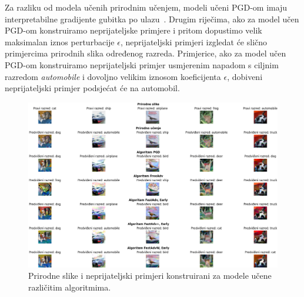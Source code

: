 \documentclass[times, utf8, zavrsni, numeric]{fer}
\begin{document}

Za razliku od modela učenih prirodnim učenjem, modeli učeni PGD-om imaju interpretabilne gradijente gubitka po ulazu~\cite{tsipras2018robustness}.
Drugim riječima, ako za model učen PGD-om konstruiramo neprijateljske primjere i pritom dopustimo velik maksimalan iznos perturbacije $\epsilon$, neprijateljski primjeri izgledat će slično primjercima prirodnih slika određenog razreda.
Primjerice, ako za model učen PGD-om konstruiramo neprijateljski primjer usmjerenim napadom s ciljnim razredom \textit{automobile} i dovoljno velikim iznosom koeficijenta $\epsilon$, dobiveni neprijateljski primjer podsjećat će na automobil.

\begin{figure}[htb]
    \centering
    \includegraphics[scale=0.375]{../adv_imgs_multiple_models/eps_48_255_full.png}
    \caption{Prirodne slike i neprijateljski primjeri konstruirani za modele učene različitim algoritmima.}
    \label{fig:adv_examples_multiple_models}
\end{figure}
\end{document}
